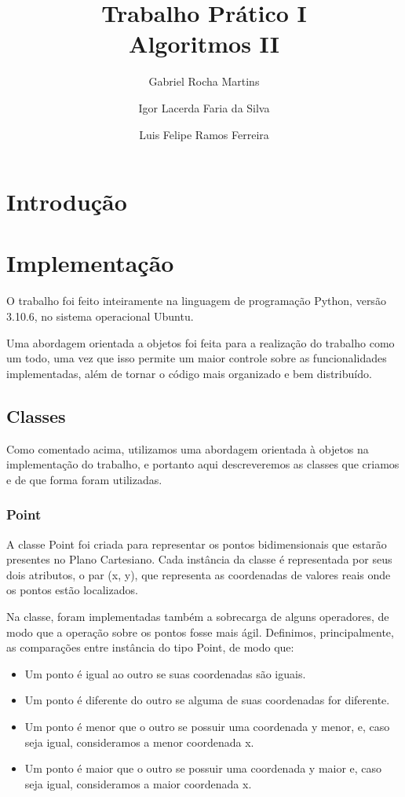 \documentclass{article}
\author{
    Gabriel Rocha Martins
    \and 
    Igor Lacerda Faria da Silva
    \and 
    Luis Felipe Ramos Ferreira
}
\title{Trabalho Prático I \\
Algoritmos II}
\date{%
}
\begin{document}
\maketitle

\section{Introdução}

\section{Implementação}
O trabalho foi feito inteiramente na linguagem de programação Python, versão 3.10.6, no sistema operacional Ubuntu.

Uma abordagem orientada a objetos foi feita para a realização do trabalho como um todo, uma vez que isso permite um maior controle sobre as funcionalidades implementadas, além de tornar o código mais organizado e bem distribuído.

\subsection{Classes}
Como comentado acima, utilizamos uma abordagem orientada à objetos na implementação do trabalho, e portanto aqui descreveremos as classes que criamos e de que forma foram utilizadas.

\subsubsection{Point}

A classe Point foi criada para representar os pontos bidimensionais que estarão presentes no Plano Cartesiano. Cada instância da classe é representada por seus dois atributos, o par (x, y), que representa as coordenadas de valores reais onde os pontos estão localizados. 

Na classe, foram implementadas também a sobrecarga de alguns operadores, de modo que a operação sobre os pontos fosse mais ágil. Definimos, principalmente, as comparações entre instância do tipo Point, de modo que:

\begin{itemize}
    \item Um ponto é igual ao outro se suas coordenadas são iguais.
    \item Um ponto é diferente do outro se alguma de suas coordenadas for diferente.
    \item Um ponto é menor que o outro se possuir uma coordenada y menor, e, caso seja igual, consideramos a menor coordenada x.
    \item Um ponto é maior que o outro se possuir uma coordenada y maior e, caso seja igual, consideramos a maior coordenada x.
\end{itemize}
\end{document}

